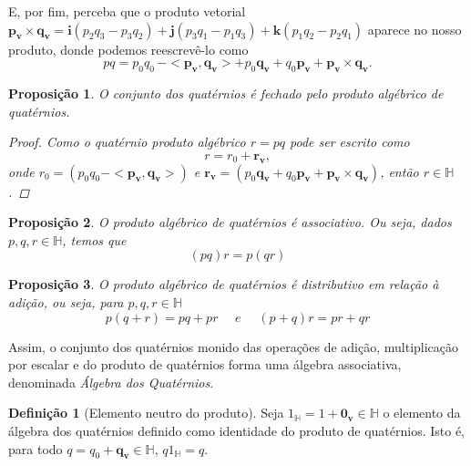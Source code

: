 \documentclass[a4paper,12pt]{report}
\theoremstyle{plain}
\newtheorem{proposicao}{Proposição}[section]
\theoremstyle{definition}
\newtheorem{definicao}{Definição}[section]
\begin{document}
	E, por fim, perceba que o produto vetorial $\mathbf{p_v} \times \mathbf{q_v} = \mathbf{i}(p_2q_3 - p_3q_2) + \mathbf{j}(p_3q_1 - p_1q_3) + \mathbf{k}(p_1q_2 - p_2q_1)$ aparece no nosso produto, donde podemos reescrevê-lo como
	\begin{equation*}
		pq=p_0q_0\,-<\mathbf{p_v,q_v}>+p_0\mathbf{q_v}+q_0\mathbf{p_v}+\mathbf{p_v}\times\mathbf{q_v}.
	\end{equation*}
	
	\begin{proposicao}
	    O conjunto dos quatérnios é fechado pelo produto algébrico de quatérnios.
		\begin{proof}
			Como o quatérnio produto algébrico $r=pq$ pode ser escrito como 
			\begin{equation}
				r=r_0+\mathbf{r_v},
			\end{equation}
			onde $r_0=(p_0q_0-<\mathbf{p_v,q_v}>)$ e $\mathbf{r_v}=(p_0\mathbf{q_v}+q_0\mathbf{p_v}+\mathbf{p_v}\times\mathbf{q_v})$, então $r \in \mathbb{H}$.
		\end{proof}
	\end{proposicao}
	
	\begin{proposicao}
		O produto algébrico de quatérnios é associativo. Ou seja, dados $p,q,r \in \mathbb{H}$, temos que 
		\begin{equation*}
			(pq)r=p(qr)
		\end{equation*}
	\end{proposicao}
	
	\begin{proposicao}
		O produto algébrico de quatérnios é distributivo em relação à adição, ou seja, para $p,q,r \in \mathbb{H}$
		\begin{equation*}
			p(q+r)=pq+pr \,\,\,\,\,\,\,\,e\,\,\,\,\,\,\,\, (p+q)r=pr+qr
		\end{equation*}	
	\end{proposicao}
	
	Assim, o conjunto dos quatérnios monido das operações de adição, multiplicação por escalar e do produto de quatérnios forma uma álgebra associativa, denominada \textit{Álgebra dos Quatérnios}.

	\begin{definicao}[Elemento neutro do produto]
		Seja $1_\mathbb{H} = 1 + \mathbf{0_v} \in \mathbb{H}$ o elemento da álgebra dos quatérnios definido como identidade do produto de quatérnios. Isto é, para todo $q = q_0 + \mathbf{q_v} \in \mathbb{H}$, $q1_\mathbb{H} = q$.
	\end{definicao}
	
\end{document}
